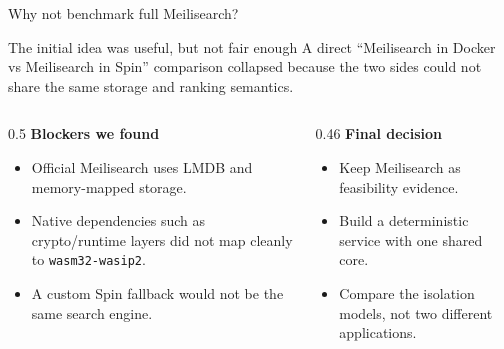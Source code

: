 \documentclass[aspectratio=169,10pt]{beamer}
\begin{document}
\begin{frame}{Why not benchmark full Meilisearch?}
  \begin{block}{The initial idea was useful, but not fair enough}
    A direct ``Meilisearch in Docker vs Meilisearch in Spin'' comparison collapsed because the two sides could not share the same storage and ranking semantics.
  \end{block}

  \begin{columns}[T,onlytextwidth]
    \begin{column}{0.5\linewidth}
      \textbf{Blockers we found}
      \begin{itemize}
        \item Official Meilisearch uses LMDB and memory-mapped storage.
        \item Native dependencies such as crypto/runtime layers did not map cleanly to \texttt{wasm32-wasip2}.
        \item A custom Spin fallback would not be the same search engine.
      \end{itemize}
    \end{column}
    \begin{column}{0.46\linewidth}
      \textbf{Final decision}
      \begin{itemize}
        \item Keep Meilisearch as feasibility evidence.
        \item Build a deterministic service with one shared core.
        \item Compare the isolation models, not two different applications.
      \end{itemize}
    \end{column}
  \end{columns}
\end{frame}
\end{document}
